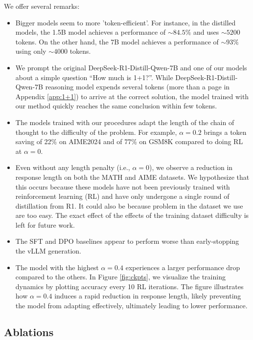We offer several remarks:

\begin{itemize}
    \item Bigger models seem to more 'token-efficient'. For instance, in the distilled models, the 1.5B model achieves a performance of $\sim84.5\%$ and uses $\sim 5200$ tokens. On the other hand, the 7B model achieves a performance of $\sim 93\%$ using only $\sim 4000$ tokens. 
    \item We prompt the original DeepSeek-R1-Distill-Qwen-7B and one of our models about a simple question ``How much is 1+1?''. While DeepSeek-R1-Distill-Qwen-7B reasoning model expends several tokens (more than a page in Appendix \ref{app:1+1}) to arrive at the correct solution, the model trained with our method quickly reaches the same conclusion within few tokens. 
    \item The models trained with our procedures adapt the length of the chain of thought to the difficulty of the problem. For example, $\alpha = 0.2$ brings a token saving of 22\% on AIME2024 and of 77\% on GSM8K compared to doing RL at $\alpha=0$.
    \item Even without any length penalty (i.e., \( \alpha = 0 \)), we observe a reduction in response length on both the MATH and AIME datasets. We hypothesize that this occurs because these models have not been previously trained with reinforcement learning (RL) and have only undergone a single round of distillation from R1. It could also be because problem in the dataset we use are too easy. The exact effect of the effects of the training dataset difficulty is left for future work. 
    \item The SFT and DPO baselines appear to perform worse than early-stopping the vLLM generation. 
    \item The model with the highest \( \alpha = 0.4 \) experiences a larger performance drop compared to the others. In Figure \ref{fig:ckpts}, we visualize the training dynamics by plotting accuracy every 10 RL iterations. The figure illustrates how \( \alpha = 0.4 \) induces a rapid reduction in response length, likely preventing the model from adapting effectively, ultimately leading to lower performance.

\end{itemize}

\subsection{Ablations}


